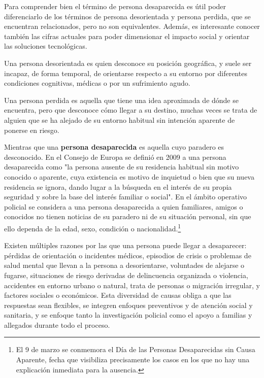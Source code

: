     
    Para comprender bien el término de persona desaparecida es útil poder diferenciarlo de los términos de persona desorientada y persona perdida, que se encuentran relacionados, pero no son equivalentes. Además, es interesante conocer también las cifras actuales para poder dimensionar el impacto social y orientar las soluciones tecnológicas.
    
    Una persona desorientada es quien desconoce su posición geográfica, y suele ser incapaz, de forma temporal, de orientarse respecto a su entorno por diferentes condiciones cognitivas, médicas o por un sufrimiento agudo. \cite{RAEdesorientar}
       
    Una persona perdida es aquella que tiene una idea aproximada de dónde se encuentra, pero que desconoce cómo llegar a su destino, muchas veces se trata de alguien que se ha alejado de su entorno habitual sin intención aparente de ponerse en riesgo. \cite{RAEperdido}
    
    Mientras que una \textbf{persona desaparecida} es aquella cuyo paradero es desconocido. En el Consejo de Europa se definió en 2009 a una persona desaparecida como "la persona ausente de su residencia habitual sin motivo conocido o aparente, cuya existencia es motivo de inquietud o bien que su nueva residencia se ignora, dando lugar a la búsqueda en el interés de su propia seguridad y sobre la base del interés familiar o social"\cite{ConsejoEuropaDesaparicion2016}. En el ámbito operativo policial se considera a una persona desaparecida a quien familiares, amigos o conocidos no tienen noticias de su paradero ni de su situación personal, sin que ello dependa de la edad, sexo, condición o nacionalidad\cite{CNDES, cndesprotocoloFFCC, plan_desaparecidos_2022, SOSDesaparecidosActuar}.\footnote{El 9 de marzo se conmemora el Día de las Personas Desaparecidas sin Causa Aparente, fecha que visibiliza precisamente los casos en los que no hay una explicación inmediata para la ausencia.}
    
    Existen múltiples razones por las que una persona puede llegar a desaparecer: pérdidas de orientación o incidentes médicos, episodios de crisis o problemas de salud mental que llevan a la persona a desorientarse, voluntades de alejarse o fugarse, situaciones de riesgo derivadas de delincuencia organizada o violencia, accidentes en entorno urbano o natural, trata de personas o migración irregular, y factores sociales o económicos. Esta diversidad de causas obliga a que las respuestas sean flexibles, se integren enfoques preventivos y de atención social y sanitaria, y se enfoque tanto la investigación policial como el apoyo a familias y allegados durante todo el proceso.
    
